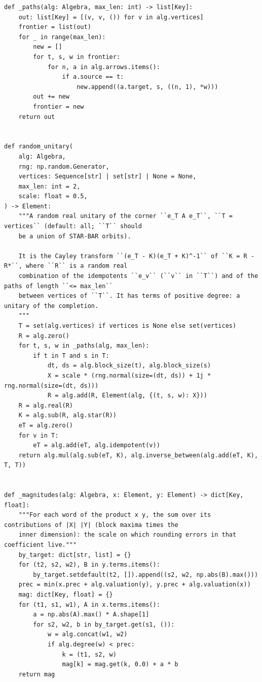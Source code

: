 \documentclass[12pt, a4paper]{report}
\theoremstyle{plain}
\theoremstyle{definition}
\theoremstyle{remark}
\theoremstyle{plain}
\begin{document}
\begin{lstlisting}[style=dsqcode]
def _paths(alg: Algebra, max_len: int) -> list[Key]:
    out: list[Key] = [(v, v, ()) for v in alg.vertices]
    frontier = list(out)
    for _ in range(max_len):
        new = []
        for t, s, w in frontier:
            for n, a in alg.arrows.items():
                if a.source == t:
                    new.append((a.target, s, ((n, 1), *w)))
        out += new
        frontier = new
    return out


def random_unitary(
    alg: Algebra,
    rng: np.random.Generator,
    vertices: Sequence[str] | set[str] | None = None,
    max_len: int = 2,
    scale: float = 0.5,
) -> Element:
    """A random real unitary of the corner ``e_T A e_T``, ``T = vertices`` (default: all; ``T`` should
    be a union of STAR-BAR orbits).

    It is the Cayley transform ``(e_T - K)(e_T + K)^-1`` of ``K = R - R*``, where ``R`` is a random real
    combination of the idempotents ``e_v`` (``v`` in ``T``) and of the paths of length ``<= max_len``
    between vertices of ``T``. It has terms of positive degree: a unitary of the completion.
    """
    T = set(alg.vertices) if vertices is None else set(vertices)
    R = alg.zero()
    for t, s, w in _paths(alg, max_len):
        if t in T and s in T:
            dt, ds = alg.block_size(t), alg.block_size(s)
            X = scale * (rng.normal(size=(dt, ds)) + 1j * rng.normal(size=(dt, ds)))
            R = alg.add(R, Element(alg, {(t, s, w): X}))
    R = alg.real(R)
    K = alg.sub(R, alg.star(R))
    eT = alg.zero()
    for v in T:
        eT = alg.add(eT, alg.idempotent(v))
    return alg.mul(alg.sub(eT, K), alg.inverse_between(alg.add(eT, K), T, T))


def _magnitudes(alg: Algebra, x: Element, y: Element) -> dict[Key, float]:
    """For each word of the product x y, the sum over its contributions of |X| |Y| (block maxima times the
    inner dimension): the scale on which rounding errors in that coefficient live."""
    by_target: dict[str, list] = {}
    for (t2, s2, w2), B in y.terms.items():
        by_target.setdefault(t2, []).append((s2, w2, np.abs(B).max()))
    prec = min(x.prec + alg.valuation(y), y.prec + alg.valuation(x))
    mag: dict[Key, float] = {}
    for (t1, s1, w1), A in x.terms.items():
        a = np.abs(A).max() * A.shape[1]
        for s2, w2, b in by_target.get(s1, ()):
            w = alg.concat(w1, w2)
            if alg.degree(w) < prec:
                k = (t1, s2, w)
                mag[k] = mag.get(k, 0.0) + a * b
    return mag



\end{lstlisting}
\end{document}
